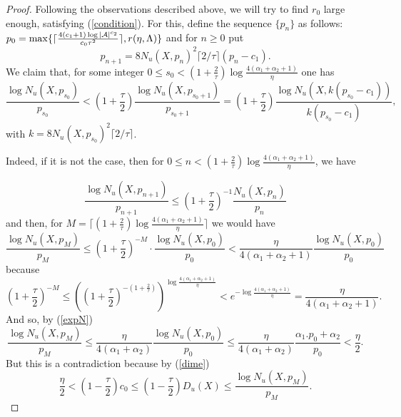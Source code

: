 \documentclass[12pt]{amsart}
\theoremstyle{plain} %
\theoremstyle{definition} %
\numberwithin{equation}{section}
\begin{document}
\begin{proof}
Following the observations described above, we will try to find $r_0$ large enough, satisfying (\ref{condition}). For this, define the sequence $\{p_n\}$ as follows: $p_0=\max \{ \lceil\frac{4(c_1+1)\log|\mathcal{A}|^{c_2}}{c_0\tau^2}\rceil,\\ r(\eta,\Lambda) \}$ and for $n\geq0$ put 
$$p_{n+1}=8 N_u(X,p_n)^2\lceil2/\tau\rceil(p_n -c_1).$$
We claim that, for some integer $0\leq s_0<(1+\frac{2}{\tau})\log \frac{4(\alpha_1 + \alpha_2+1)}{\eta}$ one has 
 $$\frac{\log N_u(X,p_{s_0})}{p_{s_0}} < (1+\frac{\tau}{2})\frac{\log N_u(X,p_{s_0+1})}{p_{s_0+1}}= (1+\frac{\tau}{2})\frac{\log N_u(X,k(p_{s_0}-c_1))}{k(p_{s_0}-c_1)},$$
with 
$k=8 N_u(X,p_{s_0})^2\lceil2/\tau\rceil$. 

Indeed, if it is not the case, then for 
$0\leq n<(1+\frac{2}{\tau})\log\frac{4(\alpha_1 + \alpha_2+1)}{\eta}$, we have 

$$\frac{\log N_u(X,p_{n+1})}{p_{n+1}}\leq (1+\frac{\tau}{2})^{-1}\frac{N_u(X,p_n)}{p_n} $$ 
and then, for $M=\lceil  (1+\frac{2}{\tau})\log\frac{4(\alpha_1 + \alpha_2+1)}{\eta}  \rceil$ we would have 
$$\frac{\log N_u(X,p_M)}{p_M} \leq (1+\frac{\tau}{2})^{-M} \cdot\frac{\log N_u(X,p_0)}{p_0} < \frac{\eta}{4(\alpha_1 + \alpha_2+1)}\frac{\log N_u(X,p_0)}{p_0}$$ 
because 
$$(1+\frac{\tau}{2})^{-M} \leq ((1+\frac{\tau}{2})^{-(1+\frac{2}{\tau})})^{\log\frac{4(\alpha_1+\alpha_2+1)}{\eta}} < e^{-\log\frac{4(\alpha_1+\alpha_2+1)}{\eta}}=\frac{\eta}{4(\alpha_1+\alpha_2+1)}.$$
And so, by (\ref{expN})
$$\frac{\log N_u(X,p_M)}{p_M} \leq \frac{\eta}{4(\alpha_1 + \alpha_2)}\frac{\log N_u(X,p_0)}{p_0} \leq \frac{\eta}{4(\alpha_1 + \alpha_2)}\frac{\alpha_1.p_0 + \alpha_2}{p_0}<\frac{\eta}{2}.$$ 
But this is a contradiction because by (\ref{dime})
$$\frac{\eta}{2} < (1-\frac{\tau}{2})c_0 \leq (1-\frac{\tau}{2})D_u(X) \leq \frac{\log N_u(X,p_M)}{p_M}.$$


\end{proof}
\end{document}
